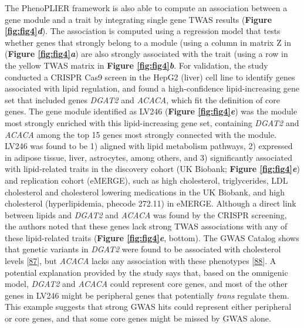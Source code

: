 The PhenoPLIER framework is also able to compute an association between a gene module and a trait by integrating single gene TWAS results (\textbf{Figure \ref{fig:fig4}\emph{d}}).
The association is computed using a regression model that tests whether genes that strongly belong to a module (using a column in matrix Z in (\textbf{Figure \ref{fig:fig4}\emph{a}}) are also strongly associated with the trait (using a row in the yellow TWAS matrix in \textbf{Figure \ref{fig:fig4}\emph{b}}.
For validation, the study conducted a CRISPR Cas9 screen in the HepG2 (liver) cell line to identify genes associated with lipid regulation, and found a high-confidence lipid-increasing gene set that included genes \emph{DGAT2} and \emph{ACACA}, which fit the definition of core genes.
The gene module identified as LV246 (\textbf{Figure \ref{fig:fig4}\emph{e}}) was the module most strongly enriched with this lipid-increasing gene set, containing \emph{DGAT2} and \emph{ACACA} among the top 15 genes most strongly connected with the module.
LV246 was found to be 1) aligned with lipid metabolism pathways, 2) expressed in adipose tissue, liver, astrocytes, among others, and 3) significantly associated with lipid-related traits in the discovery cohort (UK Biobank; \textbf{Figure \ref{fig:fig4}\emph{e}}) and replication cohort (eMERGE), such as high cholesterol, triglycerides, LDL cholesterol and cholesterol lowering medications in the UK Biobank, and high cholesterol (hyperlipidemia, phecode 272.11) in eMERGE.
Although a direct link between lipids and \emph{DGAT2} and \emph{ACACA} was found by the CRISPR screening, the authors noted that these genes lack strong TWAS associations with any of these lipid-related traits (\textbf{Figure \ref{fig:fig4}\emph{e}}, bottom).
The GWAS Catalog shows that genetic variants in \emph{DGAT2} were found to be associated with cholesterol levels {[}\protect\hyperlink{ref-xJjWGVyN}{87}{]}, but \emph{ACACA} lacks any association with these phenotypes {[}\protect\hyperlink{ref-1GM0PmkWn}{88}{]}.
A potential explanation provided by the study says that, based on the omnigenic model, \emph{DGAT2} and \emph{ACACA} could represent core genes, and most of the other genes in LV246 might be peripheral genes that potentially \emph{trans} regulate them.
This example suggests that strong GWAS hits could represent either peripheral or core genes, and that some core genes might be missed by GWAS alone.

